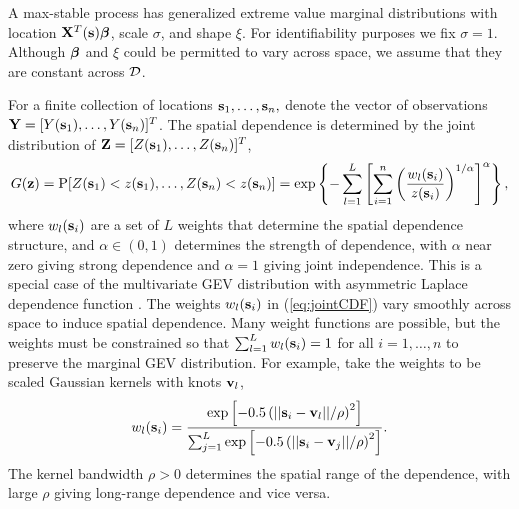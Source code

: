 



A max-stable process has generalized extreme value marginal distributions with location $\mathbf{X}^T(\mathbf{s}) \mbox{\boldmath $\beta$}$, scale $\sigma$, and shape $\xi$.
For identifiability purposes we fix $\sigma = 1$.
Although $\mbox{\boldmath $\beta$}$ and $\xi$ could be permitted to vary across space, we assume that they are constant across ${\cal D}$.

For a finite collection of locations $\mathbf{s}_1, \ldots, \mathbf{s}_n,$ denote the vector of observations $\mathbf{Y} = [Y(\mathbf{s}_1), \ldots, Y(\mathbf{s}_n)]^T$.
The spatial dependence is determined by the joint distribution of $\mathbf{Z} = [Z(\mathbf{s}_1),\ldots, Z(\mathbf{s}_n)]^T$,
\begin{align}\label{eq:jointCDF}
  G(\mathbf{z}) = \mbox{P}[Z(\mathbf{s}_1) < z(\mathbf{s}_1), \ldots, Z(\mathbf{s}_n) < z(\mathbf{s}_n)] = \exp\left\{-\sum_{l=1}^L\left[\sum_{i=1}^n\left(\frac{w_{l}(\mathbf{s}_i)}{z(\mathbf{s}_i)}\right)^{1/\alpha}\right]^{\alpha}\right\},
\end{align}
where $w_{l}(\mathbf{s}_i)$ are a set of $L$ weights that determine the spatial dependence structure, and $\alpha\in(0,1)$ determines the strength of dependence, with $\alpha$ near zero giving strong dependence and $\alpha=1$ giving joint independence.
This is a special case of the multivariate GEV distribution with asymmetric Laplace dependence function \citep{Tawn1990}.
The weights $w_{l}(\mathbf{s}_i)$ in (\ref{eq:jointCDF}) vary smoothly across space to induce spatial dependence.
Many weight functions are possible, but the weights must be constrained so that $\sum_{l=1}^L w_{l}(\mathbf{s}_i)=1$ for all $i=1,\ldots,n$ to preserve the marginal GEV distribution.
For example, \cite{Reich2012} take the weights to be scaled Gaussian kernels with knots $\mathbf{v}_l$,
\begin{align}\label{w}
   w_{l}(\mathbf{s}_i) = \frac{\exp\left[-0.5\left(||\mathbf{s}_i-\mathbf{v}_l||/\rho\right)^2\right]}
                 {\sum_{j=1}^L\exp\left[-0.5\left(||\mathbf{s}_i-\mathbf{v}_j||/\rho\right)^2\right]}.
\end{align}
The kernel bandwidth $\rho>0$ determines the spatial range of the dependence, with large $\rho$ giving long-range dependence and vice versa.

